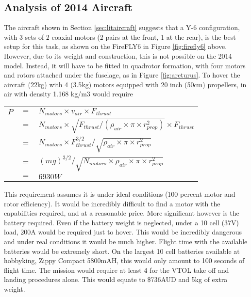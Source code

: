\label{sec:AppA}
\subsection{Analysis of 2014 Aircraft}
\label{sec:lastYear}
The aircraft shown in Section \ref{sec:litaircraft} suggests that a Y-6 configuration, with 3 sets of 2 coaxial motors (2 pairs at the front, 1 at the rear), is the best setup for this task, as shown on the FireFLY6 in Figure \ref{fig:firefly6} above. However, due to its weight and construction, this is not possible on the 2014 model. Instead, it will have to be fitted in quadrotor formation, with four motors and rotors attached under the fuselage, as in Figure \ref{fig:arcturus}. To hover the aircraft (22kg) with 4 (3.5kg) motors equipped with 20 inch (50cm) propellers, in air with density 1.168 kg/m3 would require\\

\begin{tabular}{r c l}
	$P$ & $=$ & $N_{motors} \times v_{air} \times F_{thrust}$\\
	& $=$ & $N_{motors} \times \sqrt{F_{thrust}/(\rho_{air} \times \pi \times r_{prop}^2)} \times F_{thrust}$\\
	& $=$ & $N_{motors} \times F_{thrust}^{3/2}/\sqrt{\rho_{air} \times \pi \times r_{prop}^2}$\\
	& $=$ & $(mg)^{3/2}/\sqrt{N_{motors} \times \rho_{air} \times \pi \times r_{prop}^2}$\\
	& $=$ & $6930W$\\
\end{tabular}
\vspace{6pt}
	
This requirement assumes it is under ideal conditions (100 percent motor and rotor efficiency). It would be incredibly difficult to find a motor with the capabilities required, and at a reasonable price. More significant however is the battery required. Even if the battery weight is neglected, under a 10 cell (37V) load, 200A would be required just to hover. This would be incredibly dangerous and under real conditions it would be much higher. Flight time with the available batteries would be extremely short. On the largest 10 cell batteries available at hobbyking, Zippy Compact 5800mAH, this would only amount to 100 seconds of flight time. The mission would require at least 4 for the VTOL take off and landing procedures alone. This would equate to \$736AUD and 5kg of extra weight.\\

